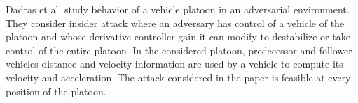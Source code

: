 Dadras et al. \cite{DGRS15} study behavior of a vehicle platoon in an adversarial environment. They consider insider attack where an adversary has control of a vehicle of the platoon and whose derivative controller gain it can modify to destabilize or take control of the entire platoon. In the considered platoon, predecessor and follower vehicles distance and velocity information are used by a vehicle to compute its velocity and acceleration. The attack considered in the paper is feasible at every position of the platoon. 
